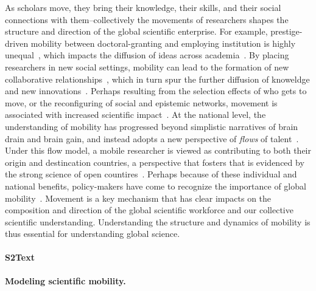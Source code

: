 \documentclass[12pt]{article} %
\begin{document}
As scholars move, they bring their knowledge, their skills, and their social connections with them--collectively the movements of researchers shapes the structure and direction of the global scientific enterprise.
For example, prestige-driven mobility between doctoral-granting and employing institution is highly unequal~\autocite{clauset2015hierarchy, deville2014career}, which impacts the diffusion of ideas across academia~\autocite{morgan2018prestige}. 
By placing researchers in new social settings, mobility can lead to the formation of new collaborative relationships~\autocite{rodrigues2016mobility}, which in turn spur the further diffusion of knoweldge and new innovations~\autocite{braunerhjelm2020labor, azoulay2011diffusion, kaiser2018innovation, armano2017innovation}. 
Perhaps resulting from the selection effects of who gets to move, or the reconfiguring of social and epistemic networks, movement is associated with increased scientific impact~\autocite{sugimoto2017mostimpact, petersen2018multiscale, jonkers2013return, franzoni2014advantage}. 
At the national level, the understanding of mobility has progressed beyond simplistic narratives of brain drain and brain gain, and instead adopts a new perspective of \textit{flows} of talent~\autocite{meyer2001network, ioannidis2014braindrain, gaillard1998circulation}.
Under this flow model, a mobile researcher is viewed as contributing to both their origin and destincation countries, a perspective that fosters that is evidenced by the strong science of open countires~\autocite{wagner2017open}. 
Perhaps because of these individual and national benefits, policy-makers have come to recognize the importance of global mobility~\autocite{box2008competition, oecd2010innovation}. 
Movement is a key mechanism that has clear impacts on the composition and direction of the global scientific workforce and our collective scientific understanding. 
Understanding the structure and dynamics of mobility is thus essential for understanding global science.

%
\paragraph*{S2Text}
\label{si:text:mobility_models}
{\bf Modeling scientific mobility.}
\end{document}
